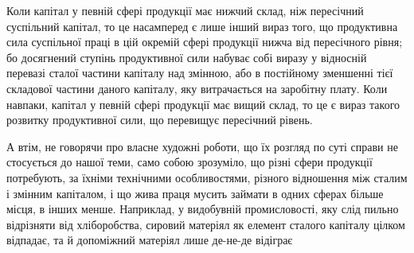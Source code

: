 Коли капітал у певній сфері продукції має нижчий склад, ніж пересічний
суспільний капітал, то це насамперед є лише інший вираз того, що продуктивна
сила суспільної праці в цій окремій сфері продукції нижча від пересічного
рівня; бо досягнений ступінь продуктивної сили набуває собі виразу
у відносній перевазі сталої частини капіталу над змінною, або в постійному
зменшенні тієї складової частини даного капіталу, яку витрачається на заробітну
плату. Коли навпаки, капітал у певній сфері продукції має вищий склад,
то це є вираз такого розвитку продуктивної сили, що перевищує пересічний рівень.

А втім, не говорячи про власне художні роботи, що їх розгляд по суті
справи не стосується до нашої теми, само собою зрозуміло, що різні сфери продукції потребують, за
їхніми технічними особливостями, різного відношення між сталим і змінним капіталом, і що жива праця
мусить займати в одних сферах більше місця, в інших менше. Наприклад, у видобувній промисловості,
яку слід пильно відрізняти від хліборобства, сировий матеріял як елемент сталого капіталу цілком
відпадає, та й допоміжний матеріял лише де-не-де відіграє
\parbreak{}  %
